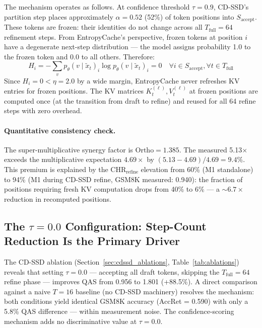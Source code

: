\documentclass{article}
\newcommand{\ortho}{\text{Ortho}}
\newcommand{\chr}{\text{CHR}}
\newcommand{\Saccept}{S_{\text{accept}}}
\newcommand{\Tfull}{T_{\text{full}}}
\begin{document}
The mechanism operates as follows. At confidence threshold $\tau = 0.9$, CD-SSD's partition step
places approximately $\alpha = 0.52$ (52\%) of token positions into $\Saccept$. These tokens are
frozen: their identities do not change across all $\Tfull = 64$ refinement steps. From
EntropyCache's perspective, frozen tokens at position $i$ have a degenerate next-step distribution
--- the model assigns probability 1.0 to the frozen token and 0.0 to all others. Therefore:
\begin{equation}
  H_i = -\sum_v p_\theta(v \mid \tilde{x}_t)_i \log p_\theta(v \mid \tilde{x}_t)_i = 0
  \quad \forall i \in \Saccept, \forall t \in \Tfull
\end{equation}
Since $H_i = 0 < \eta = 2.0$ by a wide margin, EntropyCache never refreshes KV entries for frozen
positions. The KV matrices $K^{(\ell)}_t, V^{(\ell)}_t$ at frozen positions are computed once (at
the transition from draft to refine) and reused for all 64 refine steps with zero overhead.

\paragraph{Quantitative consistency check.} The super-multiplicative synergy factor is
$\ortho = 1.385$. The measured 5.13$\times$ exceeds the multiplicative expectation $4.69\times$ by
$(5.13 - 4.69) / 4.69 = 9.4\%$. This premium is explained by the $\chr_{\text{refine}}$ elevation
from 60\% (M1 standalone) to 94\% (M1 during CD-SSD refine, GSM8K measured: 0.940): the fraction
of positions requiring fresh KV computation drops from 40\% to 6\% --- a ${\sim}6.7\times$
reduction in recomputed positions.

\subsection{The $\tau = 0.0$ Configuration: Step-Count Reduction Is the Primary Driver}
\label{sec:paradox}

The CD-SSD ablation (Section~\ref{sec:cdssd_ablations}, Table~\ref{tab:ablations}) reveals that
setting $\tau = 0.0$ --- accepting all draft tokens, skipping the $\Tfull = 64$ refine phase ---
improves QAS from 0.956 to 1.801 (+88.5\%). A direct comparison against a naive $T = 16$ baseline
(no CD-SSD machinery) resolves the mechanism: both conditions yield identical GSM8K accuracy (AccRet
= 0.590) with only a 5.8\% QAS difference --- within measurement noise. The confidence-scoring
mechanism adds no discriminative value at $\tau=0.0$.
\end{document}
